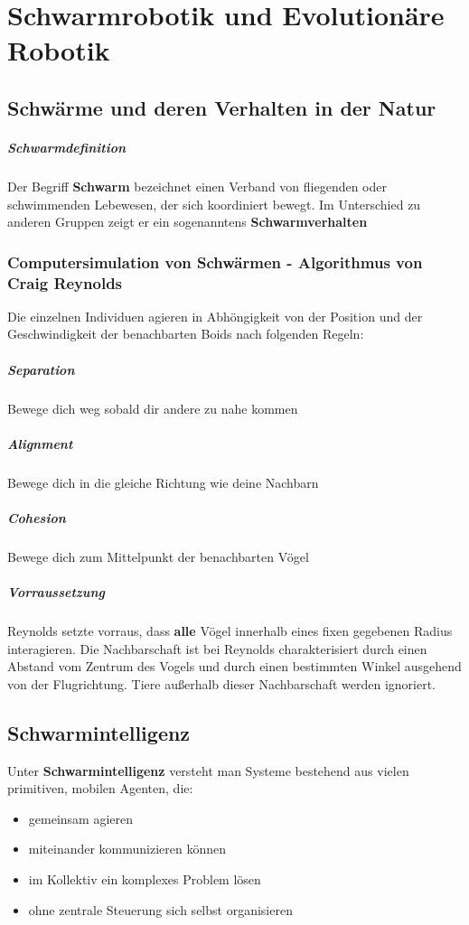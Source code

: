 \chapter{Schwarmrobotik und Evolutionäre Robotik}
\section{Schwärme  und deren Verhalten in der Natur}
\paragraph{Schwarmdefinition}
Der Begriff \textbf{Schwarm} bezeichnet einen Verband von fliegenden oder schwimmenden Lebewesen, der sich koordiniert bewegt.
Im Unterschied zu anderen Gruppen zeigt er ein sogenanntens \textbf{Schwarmverhalten}
\subsection{Computersimulation von Schwärmen - Algorithmus von Craig Reynolds}
Die einzelnen Individuen agieren in Abhöngigkeit von der Position und der Geschwindigkeit der benachbarten Boids nach folgenden Regeln:
\paragraph{Separation} Bewege dich weg sobald dir andere zu nahe kommen
\paragraph{Alignment} Bewege dich in die gleiche Richtung wie deine Nachbarn
\paragraph{Cohesion} Bewege dich zum Mittelpunkt der benachbarten Vögel
\paragraph{Vorraussetzung}
Reynolds setzte vorraus, dass \textbf{alle} Vögel innerhalb eines fixen gegebenen Radius interagieren.
Die Nachbarschaft ist bei Reynolds charakterisiert durch einen Abstand vom Zentrum des Vogels und durch einen bestimmten Winkel ausgehend von der Flugrichtung.
Tiere außerhalb dieser Nachbarschaft werden ignoriert.
\section{Schwarmintelligenz}
Unter \textbf{Schwarmintelligenz} versteht man Systeme bestehend aus vielen primitiven, mobilen Agenten, die:
\begin{itemize}
	\item gemeinsam agieren
	\item miteinander kommunizieren können
	\item im Kollektiv ein komplexes Problem lösen
	\item ohne zentrale Steuerung sich selbst organisieren
\end{itemize}
